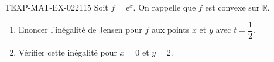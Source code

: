 \begin{exercice}{TEXP-MAT-EX-022}{1}{15}
Soit $f = \mathrm{e}^x$. On rappelle que $f$ est convexe sur $\mathbb{R}$.
\begin{enumerate}
  \item Enoncer l'inégalité de Jensen pour $f$ aux points $x$ et $y$ avec $t = \dfrac{1}{2}$.
  \item Vérifier cette inégalité pour $x = 0$ et $y = 2$.
\end{enumerate}

\end{exercice}
